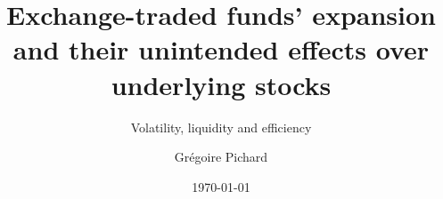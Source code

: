\documentclass[a4paper, twoside, 10pt, titlepage, abstracton, captions = tableheading]{scrartcl}
\title{Exchange-traded funds' expansion and their unintended effects over underlying stocks}
\subtitle{Volatility, liquidity and efficiency}
\date{\today}
\author{Grégoire Pichard}
\begin{document}
\maketitle

\renewcommand{\sectionautorefname}{Section}
\tableofcontents
\listoftables
\listoffigures
\clearpage

\clearpage






\clearpage
\printbibliography
\clearpage
\begin{appendices}



\end{appendices}
\end{document}
